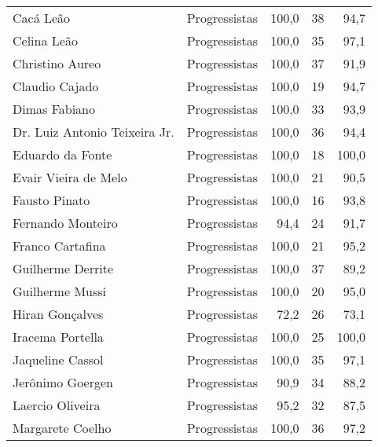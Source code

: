 \begin{longtable}{llrrr}
                           Cacá Leão &  Progressistas &     100,0 &           38 &       94,7 \\
                         Celina Leão &  Progressistas &     100,0 &           35 &       97,1 \\
                     Christino Aureo &  Progressistas &     100,0 &           37 &       91,9 \\
                      Claudio Cajado &  Progressistas &     100,0 &           19 &       94,7 \\
                       Dimas Fabiano &  Progressistas &     100,0 &           33 &       93,9 \\
       Dr. Luiz Antonio Teixeira Jr. &  Progressistas &     100,0 &           36 &       94,4 \\
                    Eduardo da Fonte &  Progressistas &     100,0 &           18 &      100,0 \\
                Evair Vieira de Melo &  Progressistas &     100,0 &           21 &       90,5 \\
                       Fausto Pinato &  Progressistas &     100,0 &           16 &       93,8 \\
                   Fernando Monteiro &  Progressistas &      94,4 &           24 &       91,7 \\
                    Franco Cartafina &  Progressistas &     100,0 &           21 &       95,2 \\
                   Guilherme Derrite &  Progressistas &     100,0 &           37 &       89,2 \\
                     Guilherme Mussi &  Progressistas &     100,0 &           20 &       95,0 \\
                     Hiran Gonçalves &  Progressistas &      72,2 &           26 &       73,1 \\
                    Iracema Portella &  Progressistas &     100,0 &           25 &      100,0 \\
                    Jaqueline Cassol &  Progressistas &     100,0 &           35 &       97,1 \\
                    Jerônimo Goergen &  Progressistas &      90,9 &           34 &       88,2 \\
                    Laercio Oliveira &  Progressistas &      95,2 &           32 &       87,5 \\
                    Margarete Coelho &  Progressistas &     100,0 &           36 &       97,2 \\

\end{longtable}
